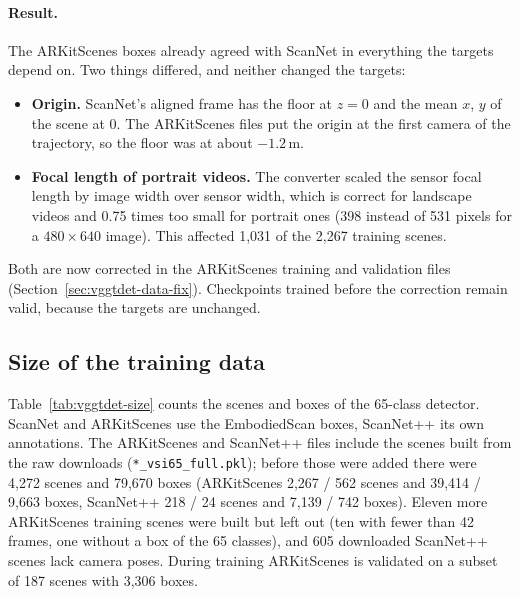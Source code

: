 \paragraph{Result.}
The ARKitScenes boxes already agreed with ScanNet in everything the targets depend on. Two things differed,
and neither changed the targets:
\begin{itemize}
\item \textbf{Origin.} ScanNet's aligned frame has the floor at $z=0$ and the mean $x$, $y$ of the scene at 0.
The ARKitScenes files put the origin at the first camera of the trajectory, so the floor was at about
$-1.2$\,m.
\item \textbf{Focal length of portrait videos.} The converter scaled the sensor focal length by image width
over sensor width, which is correct for landscape videos and 0.75 times too small for portrait ones
(398 instead of 531 pixels for a $480\times640$ image). This affected 1,031 of the 2,267 training scenes.
\end{itemize}
Both are now corrected in the ARKitScenes training and validation files (Section~\ref{sec:vggtdet-data-fix}).
Checkpoints trained before the correction remain valid, because the targets are unchanged.

\subsection{Size of the training data}
\label{sec:vggtdet-data-size}

Table~\ref{tab:vggtdet-size} counts the scenes and boxes of the 65-class detector. ScanNet and ARKitScenes use
the EmbodiedScan boxes, ScanNet++ its own annotations. The ARKitScenes and ScanNet++ files include the scenes
built from the raw downloads (\texttt{*\_vsi65\_full.pkl}); before those were added there were 4,272 scenes and
79,670 boxes (ARKitScenes 2,267 / 562 scenes and 39,414 / 9,663 boxes, ScanNet++ 218 / 24 scenes and 7,139 / 742
boxes). Eleven more ARKitScenes training scenes were built but left out (ten with fewer than 42 frames, one without
a box of the 65 classes), and 605 downloaded ScanNet++ scenes lack camera poses. During training ARKitScenes is
validated on a subset of 187 scenes with 3,306 boxes.

